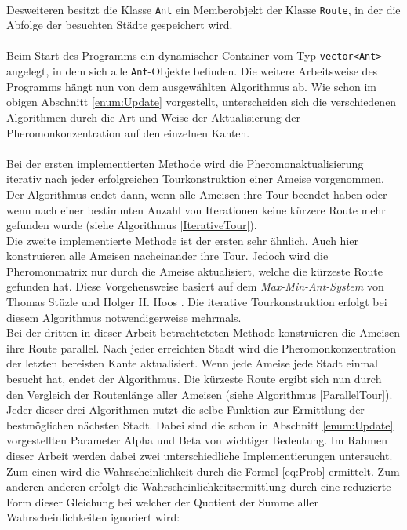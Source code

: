 \documentclass[doktyp=barbeit, sprache=german]{TUBAFarbeiten}
\begin{document}
\\Desweiteren besitzt die Klasse \texttt{Ant} ein Memberobjekt der Klasse \texttt{Route}, in der die Abfolge der besuchten Städte gespeichert wird. 
\\\\Beim Start des Programms ein dynamischer Container vom Typ \texttt{vector<Ant>} angelegt, in dem sich alle \texttt{Ant}-Objekte befinden. Die weitere Arbeitsweise des Programms hängt nun von dem ausgewählten Algorithmus ab. Wie schon im obigen Abschnitt \ref{enum:Update} vorgestellt, unterscheiden sich die verschiedenen Algorithmen durch die Art und Weise der Aktualisierung der Pheromonkonzentration auf den einzelnen Kanten.
\\\\Bei der ersten implementierten Methode wird die Pheromonaktualisierung iterativ nach jeder erfolgreichen Tourkonstruktion einer Ameise vorgenommen. Der Algorithmus endet dann, wenn alle Ameisen ihre Tour beendet haben oder wenn nach einer bestimmten Anzahl von Iterationen keine kürzere Route mehr gefunden wurde (siehe Algorithmus \ref{IterativeTour}).
\\Die zweite implementierte Methode ist der ersten sehr ähnlich. Auch hier konstruieren alle Ameisen nacheinander ihre Tour. Jedoch wird die Pheromonmatrix nur durch die Ameise aktualisiert, welche die kürzeste Route gefunden hat. Diese Vorgehensweise basiert auf dem \textit{Max-Min-Ant-System} von Thomas Stüzle und Holger H. Hoos \cite{MaxMin}. Die iterative Tourkonstruktion erfolgt bei diesem Algorithmus notwendigerweise mehrmals. 
\\Bei der dritten in dieser Arbeit betrachteteten Methode konstruieren die Ameisen ihre Route parallel. Nach jeder erreichten Stadt wird die Pheromonkonzentration der letzten bereisten Kante aktualisiert. Wenn jede Ameise jede Stadt einmal besucht hat, endet der Algorithmus. Die kürzeste Route ergibt sich nun durch den Vergleich der Routenlänge aller Ameisen (siehe Algorithmus \ref{ParallelTour}).
\\Jeder dieser drei Algorithmen nutzt die selbe Funktion zur Ermittlung der bestmöglichen nächsten Stadt. Dabei sind die schon in Abschnitt \ref{enum:Update} vorgestellten Parameter Alpha und Beta von wichtiger Bedeutung. Im Rahmen dieser Arbeit werden dabei zwei unterschiedliche Implementierungen untersucht. Zum einen wird die Wahrscheinlichkeit durch die Formel \ref{eq:Prob} ermittelt. Zum anderen anderen erfolgt die Wahrscheinlichkeitsermittlung durch eine reduzierte Form dieser Gleichung bei welcher der Quotient der Summe aller Wahrscheinlichkeiten ignoriert wird:
\end{document}

